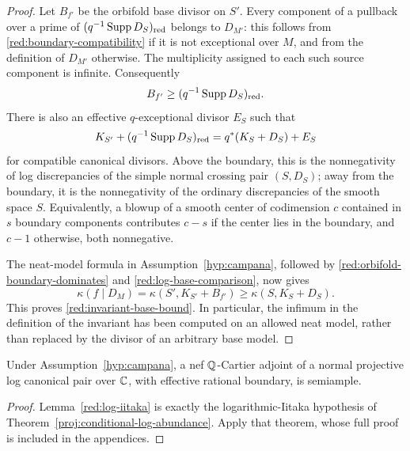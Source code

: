 \begin{proof}
Let \(B_{f'}\) be the orbifold base divisor on \(S'\). Every component
of a pullback over a prime of
\((q^{-1}\operatorname{Supp} D_S)_{\mathrm{red}}\) belongs to \(D_{M'}\): this follows
from \eqref{red:boundary-compatibility} if it is not exceptional over
\(M\), and from the definition of \(D_{M'}\) otherwise. The multiplicity
assigned to each such source component is infinite. Consequently
\begin{equation}\label{red:orbifold-boundary-dominates}
 B_{f'}\geq(q^{-1}\operatorname{Supp} D_S)_{\mathrm{red}}.
\end{equation}
There is also an effective \(q\)-exceptional divisor \(E_S\) such that
\begin{equation}\label{red:log-base-comparison}
 K_{S'}+(q^{-1}\operatorname{Supp} D_S)_{\mathrm{red}}
   =q^*(K_S+D_S)+E_S
\end{equation}
for compatible canonical divisors. Above the boundary, this is the
nonnegativity of log discrepancies of the simple normal crossing pair
\((S,D_S)\); away from the boundary, it is the nonnegativity of the
ordinary discrepancies of the smooth space \(S\). Equivalently, a
blowup of a smooth center of codimension \(c\) contained in \(s\) boundary
components contributes \(c-s\) if the center lies in the boundary, and
\(c-1\) otherwise, both nonnegative.

The neat-model formula in Assumption~\ref{hyp:campana}, followed by
\eqref{red:orbifold-boundary-dominates} and
\eqref{red:log-base-comparison}, now gives
\[
 \kappa(f\mid D_M)
 =\kappa(S',K_{S'}+B_{f'})
 \geq\kappa(S,K_S+D_S).
\]
This proves \eqref{red:invariant-base-bound}. In particular, the infimum
in the definition of the invariant has been computed on an allowed neat
model, rather than replaced by the divisor of an arbitrary base model.
\end{proof}

\begin{corollary}
\label{red:projective}
Under Assumption~\ref{hyp:campana}, a nef \(\mathbb{Q}\)-Cartier adjoint of a
normal projective log canonical pair over \(\mathbb{C}\), with effective rational
boundary, is semiample.
\end{corollary}

\begin{proof}
Lemma~\ref{red:log-iitaka} is exactly the logarithmic-Iitaka hypothesis
of Theorem~\ref{proj:conditional-log-abundance}. Apply that theorem,
whose full proof is included in the appendices.
\end{proof}

